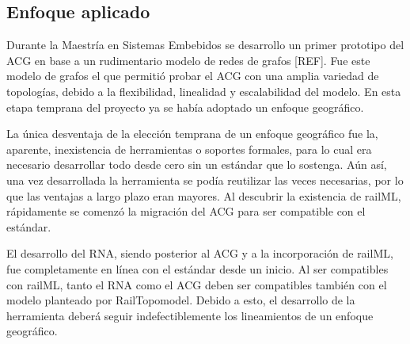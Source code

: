 \subsection{Enfoque aplicado}

    Durante la Maestría en Sistemas Embebidos se desarrollo un primer prototipo del ACG en base a un rudimentario modelo de redes de grafos [REF]. Fue este modelo de grafos el que permitió probar el ACG con una amplia variedad de topologías, debido a la flexibilidad, linealidad y escalabilidad del modelo. En esta etapa temprana del proyecto ya se había adoptado un enfoque geográfico.

    La única desventaja de la elección temprana de un enfoque geográfico fue la, aparente, inexistencia de herramientas o soportes formales, para lo cual era necesario desarrollar todo desde cero sin un estándar que lo sostenga. Aún así, una vez desarrollada la herramienta se podía reutilizar las veces necesarias, por lo que las ventajas a largo plazo eran mayores. Al descubrir la existencia de railML, rápidamente se comenzó la migración del ACG para ser compatible con el estándar.

    El desarrollo del RNA, siendo posterior al ACG y a la incorporación de railML, fue completamente en línea con el estándar desde un inicio. Al ser compatibles con railML, tanto el RNA como el ACG deben ser compatibles también con el modelo planteado por RailTopomodel. Debido a esto, el desarrollo de la herramienta deberá seguir indefectiblemente los lineamientos de un enfoque geográfico. 